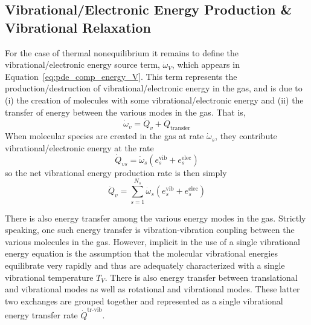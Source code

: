 \subsection{Vibrational/Electronic Energy Production \& Vibrational Relaxation}
For the case of thermal nonequilibrium it remains to define the vibrational/electronic energy source term, $\dot{\omega}_V$, which appears in Equation~\eqref{eq:pde_comp_energy_V}.  This term represents the production/destruction of vibrational/electronic energy in the gas, and is due to (i) the creation of molecules with some vibrational/electronic energy and (ii) the transfer of energy between the various modes in the gas.  That is, 
\begin{equation}
  \dot{\omega}_v = \dot{Q}_{v} + \dot{Q}_{\text{transfer}}
\end{equation}
When molecular species are created in the gas at rate $\dot{\omega}_s$, they contribute vibrational/electronic energy at the rate 
\begin{equation*}
  \dot{Q}_{vs}=\dot{\omega}_s\left(e^{\text{vib}}_{s} + e^{\text{elec}}_{s}\right)
\end{equation*}
so the net vibrational energy production rate is then simply
\begin{equation}
  \label{eq:vibrational_energy_production}
  \dot{Q}_{v} = \sum_{s=1}^{N_s} \dot{\omega}_s\left(e^{\text{vib}}_{s} + e^{\text{elec}}_{s}\right)
\end{equation}

There is also energy transfer among the various energy modes in the gas.  Strictly speaking, one such energy transfer is vibration-vibration coupling between the various molecules in the gas.  However, implicit in the use of a single vibrational energy equation is the assumption that the molecular vibrational energies equilibrate very rapidly and thus are adequately characterized with a single vibrational temperature $T_V$.  There is also energy transfer between translational and vibrational modes as well as rotational and vibrational modes.  These latter two exchanges are grouped together and represented as a single vibrational energy transfer rate $\dot{Q}^{\text{tr-vib}}$.  

